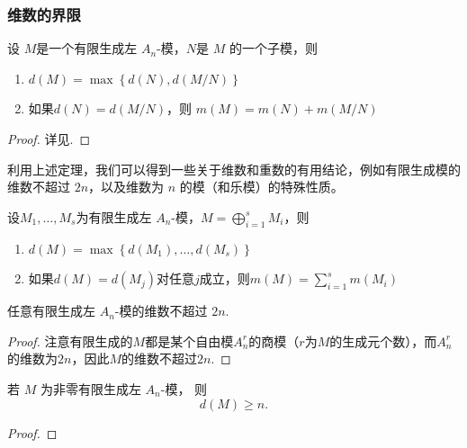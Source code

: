 \begin{example}
\subsubsection{维数的界限}
\begin{theorem}
    \label{thm:Dimension}
    设 $M$是一个有限生成左 $A_n$-模，$N$是 $M$ 的一个子模，则
    \begin{enumerate}
        \item
              $ d(M)=\max\left\{d(N),d(M/N)\right\}$
        \item
              如果$d(N)=d(M/N)$，则 $m(M)=m(N)+m(M/N)$
    \end{enumerate}
\end{theorem}
\begin{proof}
    详见\cite{coutinho1995primer}.
\end{proof}
利用上述定理，我们可以得到一些关于维数和重数的有用结论，例如有限生成模的维数不超过 $2n$，以及维数为 $n$ 的模（和乐模）的特殊性质。
\begin{corollary}
    设$M_1,\dots,M_s$为有限生成左 $A_n$-模，$M=\bigoplus_{i=1}^s M_i$，则
    \begin{enumerate}
        \item $d(M)=\max\left\{d(M_1),\dots,d(M_s)\right\}$
        \item 如果$d(M)=d(M_j)$对任意$j$成立，则$m(M)=\sum_{i=1}^s m(M_i)$
    \end{enumerate}
\end{corollary}
\begin{corollary}
    任意有限生成左 $A_n$-模的维数不超过 $2n$.
    \begin{proof}
        注意有限生成的$M$都是某个自由模$A_n^r$的商模（$r$为$M$的生成元个数），而$A_n^r$的维数为$2n$，因此$M$的维数不超过$2n$.
    \end{proof}
\end{corollary}


\begin{theorem}
    若 $M$ 为非零有限生成左 $A_n$-模，
    则
    \[
        d(M)\ge n.
    \]
    \begin{proof}


\end{proof}
\end{theorem}
\end{example}
